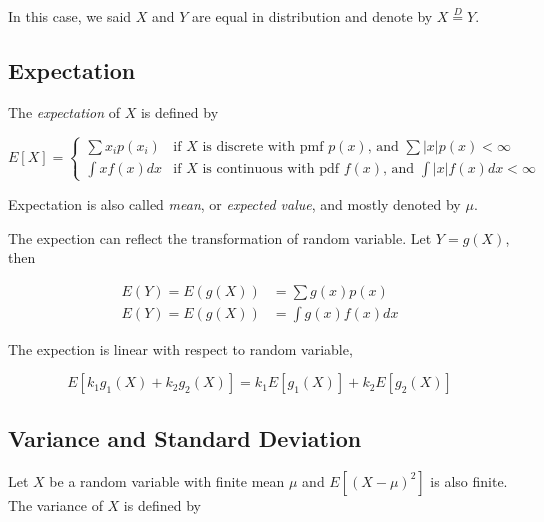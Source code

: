 \documentclass{article}
\begin{document}
            In this case, we said $ X $ and $ Y $ are equal in distribution and
            denote by $ X \stackrel{D}{=} Y $.


        \subsection{Expectation}

            The \textit{expectation} of $ X $ is defined by

            \begin{equation}
                E[X]=\left\{
                    \begin{array}{ll}
                        \sum x_i p(x_{i}) & \text{if } X \text{ is discrete with pmf } p(x) \text{, and }
                            \sum |x| p(x) < \infty \\
                        \int x f(x) dx & \text{if } X \text{ is continuous with pdf } f(x) \text{, and }
                            \int |x| f(x) dx < \infty
                    \end{array}
                \right.
            \end{equation}

            Expectation is also called \textit{mean}, or \textit{expected value},
            and mostly denoted by $ \mu $.

            The expection can reflect the transformation of random variable. Let $ Y = g(X) $, then

            \begin{align*}
                E(Y) = E ( g(X) ) &= \sum g(x) p(x) \\
                E(Y) = E ( g(X) ) &= \int g(x) f(x) dx
            \end{align*}

            The expection is linear with respect to random variable,

            \begin{equation*}
                E [ k_{1} g_{1}(X) + k_{2} g_{2}(X) ] = k_{1} E [ g_{1}(X) ] + k_{2} E [ g_{2}(X) ]
            \end{equation*}

        \subsection{Variance and Standard Deviation}

            Let $ X $ be a random variable with finite mean $ \mu $ and $ E [ (X -
            \mu)^{2} ] $ is also finite. The variance of $ X $ is defined by
\end{document}
